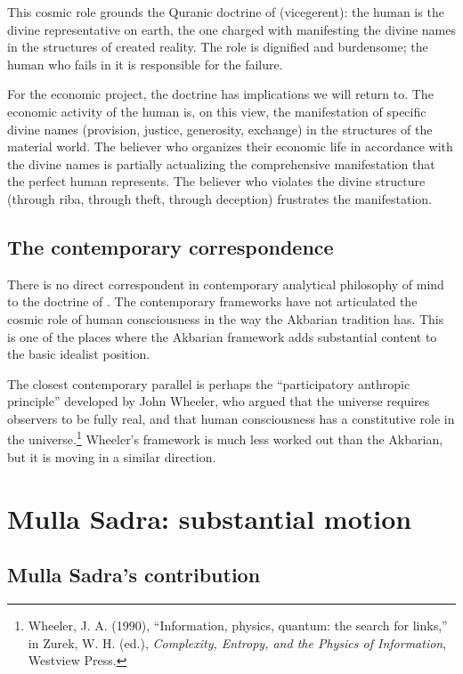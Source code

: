 This cosmic role grounds the Quranic doctrine of 
(vicegerent): the human is the divine representative on earth, the
one charged with manifesting the divine names in the structures of
created reality. The role is dignified and burdensome; the human
who fails in it is responsible for the failure.

For the economic project, the doctrine has implications we will
return to. The economic activity of the human is, on this view, the
manifestation of specific divine names (provision, justice,
generosity, exchange) in the structures of the material world. The
believer who organizes their economic life in accordance with the
divine names is partially actualizing the comprehensive
manifestation that the perfect human represents. The believer who
violates the divine structure (through riba, through theft, through
deception) frustrates the manifestation.

\subsection{The contemporary correspondence}

There is no direct correspondent in contemporary analytical
philosophy of mind to the doctrine of . The
contemporary frameworks have not articulated the cosmic role of
human consciousness in the way the Akbarian tradition has. This is
one of the places where the Akbarian framework adds substantial
content to the basic idealist position.

The closest contemporary parallel is perhaps the
``participatory anthropic principle'' developed by John Wheeler,
who argued that the universe requires observers to be fully real,
and that human consciousness has a constitutive role in the
universe.\footnote{Wheeler, J. A. (1990), ``Information, physics,
quantum: the search for links,'' in Zurek, W. H. (ed.),
\textit{Complexity, Entropy, and the Physics of Information},
Westview Press.} Wheeler's framework is much less worked out
than the Akbarian, but it is moving in a similar direction.

\section{Mulla Sadra: substantial motion}
\label{sec:mulla-sadra}

\subsection{Mulla Sadra's contribution}

